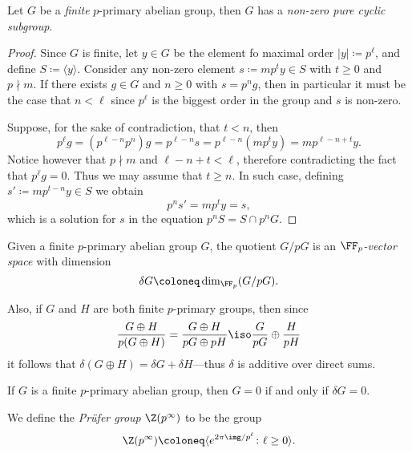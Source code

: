 \begin{lemma}
\label{lem:finite-p-primary-has-pure-cyclic-subgrp}
Let \(G\) be a \emph{finite} \(p\)-primary abelian group, then \(G\) has a
\emph{non-zero pure cyclic subgroup}.
\end{lemma}

\begin{proof}
Since \(G\) is finite, let \(y \in G\) be the element fo maximal order
\(|y| \coloneq p^{\ell}\), and define \(S \coloneq \langle y \rangle\). Consider
any non-zero element \(s \coloneq m p^t y \in S\) with \(t \geq 0\) and
\(p \nmid m\). If there exists \(g \in G\) and \(n \geq 0\) with \(s = p^n g\),
then in particular it must be the case that \(n < \ell\) since \(p^{\ell}\) is
the biggest order in the group and \(s\) is non-zero.

Suppose, for the sake of contradiction, that \(t < n\), then
\[
p^\ell g = (p^{\ell - n} p^n) g = p^{\ell - n} s = p^{\ell - n} (m p^t y) = m
p^{\ell - n + t} y.
\]
Notice however that \(p \nmid m\) and \(\ell - n + t < \ell\), therefore
contradicting the fact that \(p^{\ell} g = 0\). Thus we may assume that
\(t \geq n\). In such case, defining \(s' \coloneq m p^{t-n} y \in S\) we obtain
\[
p^n s' = m p^t y = s,
\]
which is a solution for \(s\) in the equation \(p^n S = S \cap p^n G\).
\end{proof}

\begin{definition}
\label{def:finite-p-primary-quotiented-is-Fp-vector-space}
Given a finite \(p\)-primary abelian group \(G\), the quotient \(G/pG\) is an
\emph{\(\FF_p\)-vector space} with dimension
\[
\delta G \coloneq \dim_{\FF_p}(G/pG).
\]
\end{definition}

Also, if \(G\) and \(H\) are both finite \(p\)-primary groups, then since
\[
\frac{G \oplus H}{p(G \oplus H)} = \frac{G \oplus H}{p G \oplus p H}
\iso \frac{G}{p G} \oplus \frac{H}{p H}
\]
it follows that \(\delta(G \oplus H) = \delta G + \delta H\)---thus \(\delta\)
is additive over direct sums.

\begin{corollary}
\label{cor:finite-p-primary-is-trivial-iff-delta-is-zero}
If \(G\) is a finite \(p\)-primary abelian group, then \(G = 0\) if and only if
\(\delta G = 0\).
\end{corollary}

\begin{definition}
\label{def:prufer-grp}
We define the \emph{Pr\"{u}fer group} \(\Z(p^{\infty})\) to be the group
\[
\Z(p^{\infty}) \coloneq \langle e^{2 \pi \img / p^\ell} \colon \ell \geq 0 \rangle.
\]
\end{definition}

